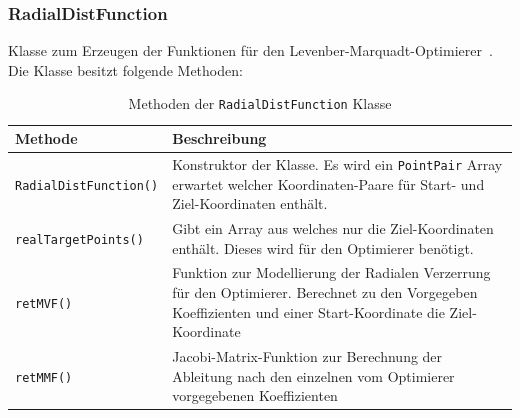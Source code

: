 \subsubsection{RadialDistFunction}
Klasse zum Erzeugen der Funktionen für den Levenber-Marquadt-Optimierer~\cite{optimizer_example}. Die Klasse besitzt folgende Methoden:

\begin{table}[H]
	\begin{tabular}{|p{} | p{}|} 
		\hline
		\textbf{Methode}& \textbf{Beschreibung}\\
		\hline
		\texttt{RadialDistFunction()} & Konstruktor der Klasse. Es wird ein \texttt{PointPair} Array erwartet welcher Koordinaten-Paare für Start- und Ziel-Koordinaten enthält.\\ \hline
		\texttt{realTargetPoints()} & Gibt ein Array aus welches nur die Ziel-Koordinaten enthält. Dieses wird für den Optimierer benötigt.\\ \hline
		\texttt{retMVF()} & Funktion zur Modellierung der Radialen Verzerrung für den Optimierer. Berechnet zu den Vorgegeben Koeffizienten und einer Start-Koordinate die Ziel-Koordinate\\ \hline
		\texttt{retMMF()} & Jacobi-Matrix-Funktion zur Berechnung der Ableitung nach den einzelnen vom Optimierer vorgegebenen Koeffizienten \\ 
		\hline
	\end{tabular}
	\caption{Methoden der \texttt{RadialDistFunction} Klasse}
\end{table}

